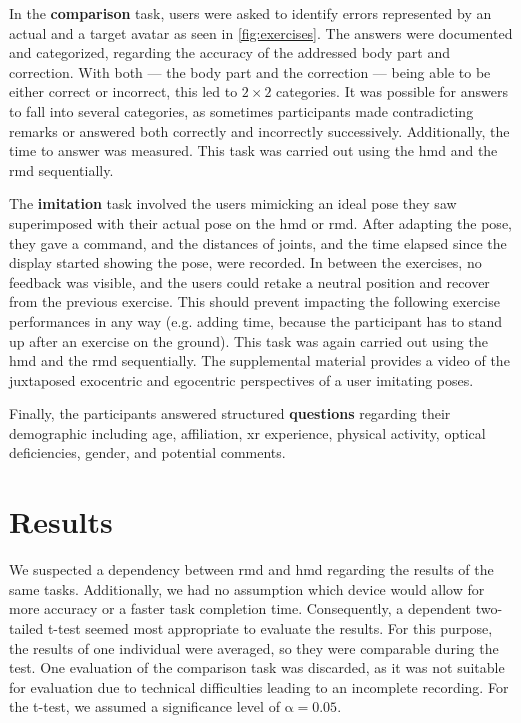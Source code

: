 In the \textbf{comparison} task, users were asked to identify errors represented by an actual and a target avatar as seen in \autoref{fig:exercises}. The answers were documented and categorized, regarding the accuracy of the addressed body part and correction. With both --- the body part and the correction --- being able to be either correct or incorrect, this led to $2 \times 2$ categories. It was possible for answers to fall into several categories, as sometimes participants made contradicting remarks or answered both correctly and incorrectly successively. Additionally, the time to answer was measured. This task was carried out using the \acrshort{hmd} and the \acrshort{rmd} sequentially.

The \textbf{imitation} task involved the users mimicking an ideal pose they saw superimposed with their actual pose on the \acrshort{hmd} or \acrshort{rmd}. After adapting the pose, they gave a command, and the distances of joints, and the time elapsed since the display started showing the pose, were recorded. In between the exercises, no feedback was visible, and the users could retake a neutral position and recover from the previous exercise. This should prevent impacting the following exercise performances in any way (e.g. adding time, because the participant has to stand up after an exercise on the ground). This task was again carried out using the \acrshort{hmd} and the \acrshort{rmd} sequentially. The supplemental material provides a video of the juxtaposed exocentric and egocentric perspectives of a user imitating poses.

Finally, the participants answered structured \textbf{questions} regarding their demographic including age, affiliation, \acrshort{xr} experience, physical activity, optical deficiencies, gender, and potential comments.

\section{Results}
We suspected a dependency between \acrshort{rmd} and \acrshort{hmd} regarding the results of the same tasks. Additionally, we had no assumption which device would allow for more accuracy or a faster task completion time. Consequently, a dependent two-tailed t-test seemed most appropriate to evaluate the results. For this purpose, the results of one individual were averaged, so they were comparable during the test. One evaluation of the comparison task was discarded, as it was not suitable for evaluation due to technical difficulties leading to an incomplete recording. For the t-test, we assumed a significance level of \(\mathrm{\alpha} = 0.05\).

